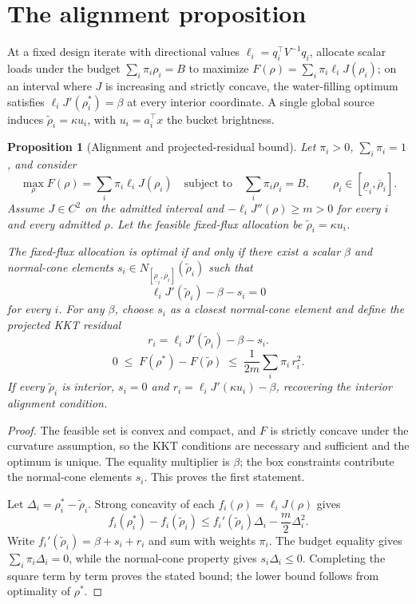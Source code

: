 \documentclass[10pt]{article}
\newtheorem{proposition}{Proposition}
\begin{document}
\section{The alignment proposition}
\label{sec:s-alignment}
At a fixed design iterate with directional values
$\ell_i = q_i^{\top}V^{-1}q_i$, allocate scalar loads under the budget
$\sum_i \pi_i\rho_i = B$ to maximize $F(\rho) = \sum_i \pi_i\ell_i
J(\rho_i)$; on an interval where $J$ is increasing and strictly concave, the
water-filling optimum satisfies $\ell_i J'(\rho_i^{*}) = \beta$ at every
interior coordinate. A single global source induces
$\tilde\rho_i = \kappa u_i$, with $u_i = a_i^{\top}x$ the bucket brightness.

\begin{proposition}[Alignment and projected-residual bound]
\label{prop:s-alignment}
Let $\pi_i>0$, $\sum_i\pi_i=1$, and consider
\[
  \max_{\rho} F(\rho)=\sum_i\pi_i\ell_iJ(\rho_i)
  \quad\text{subject to}\quad
  \sum_i\pi_i\rho_i=B,
  \qquad \rho_i\in[\underline\rho_i,\overline\rho_i].
\]
Assume $J\in C^2$ on the admitted interval and
$-\ell_iJ''(\rho)\ge m>0$ for every $i$ and every admitted $\rho$.
Let the feasible fixed-flux allocation be $\widetilde\rho_i=\kappa u_i$.

The fixed-flux allocation is optimal if and only if there exist a scalar
$\beta$ and normal-cone elements
$s_i\in N_{[\underline\rho_i,\overline\rho_i]}(\widetilde\rho_i)$ such that
\[
  \ell_iJ'(\widetilde\rho_i)-\beta-s_i=0
\]
for every $i$. For any $\beta$, choose $s_i$ as a closest normal-cone element
and define the projected KKT residual
\[
  r_i=\ell_iJ'(\widetilde\rho_i)-\beta-s_i.
\]
\begin{equation}
  0 \;\le\; F(\rho^{*}) - F(\tilde\rho)
  \;\le\; \frac{1}{2m}\sum_i \pi_i\, r_i^{2}.
  \label{eq:s-residual}
\end{equation}
If every $\widetilde\rho_i$ is interior, $s_i=0$ and
$r_i=\ell_iJ'(\kappa u_i)-\beta$, recovering the interior alignment condition.
\end{proposition}

\begin{proof}
The feasible set is convex and compact, and $F$ is strictly concave under the
curvature assumption, so the KKT conditions are necessary and sufficient and
the optimum is unique. The equality multiplier is $\beta$; the box constraints
contribute the normal-cone elements $s_i$. This proves the first statement.

Let $\Delta_i=\rho_i^*-\widetilde\rho_i$. Strong concavity of each
$f_i(\rho)=\ell_iJ(\rho)$ gives
\[
  f_i(\rho_i^*)-f_i(\widetilde\rho_i)
  \le f_i'(\widetilde\rho_i)\Delta_i-\frac m2\Delta_i^2.
\]
Write $f_i'(\widetilde\rho_i)=\beta+s_i+r_i$ and sum with weights $\pi_i$.
The budget equality gives $\sum_i\pi_i\Delta_i=0$, while the normal-cone
property gives $s_i\Delta_i\le0$. Completing the square term by term proves
the stated bound; the lower bound follows from optimality of $\rho^*$.
\end{proof}
\end{document}
